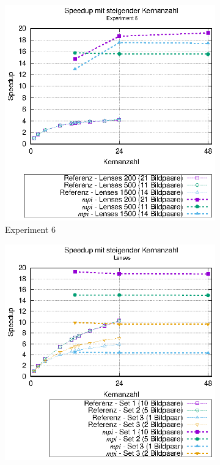 \begin{center}
	\begin{figure}[h]
		\begin{subfigure}[b]{0.45\textwidth}
			\centering
			\includegraphics[width=\textwidth]{pdf/mpi_speedup_exp6}
			\caption{Experiment 6}
			\label{fig:mpi_speedup_exp6}
		\end{subfigure}
		\hfill
		\begin{subfigure}[b]{0.45\textwidth}
			\centering
			\includegraphics[width=\textwidth]{pdf/mpi_speedup_lenses}

\end{subfigure}
\end{figure}
\end{center}
